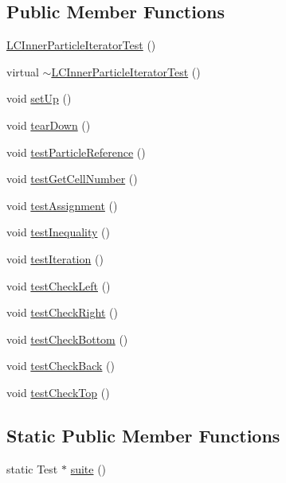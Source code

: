 \subsection*{Public Member Functions}
\begin{DoxyCompactItemize}
\item 
\hyperlink{classLCInnerParticleIteratorTest_ad3c783a3578588b75d6c973c428c84a3}{L\-C\-Inner\-Particle\-Iterator\-Test} ()
\item 
virtual \hyperlink{classLCInnerParticleIteratorTest_a4504aad35671ecb106c0987989dc8569}{$\sim$\-L\-C\-Inner\-Particle\-Iterator\-Test} ()
\item 
void \hyperlink{classLCInnerParticleIteratorTest_a1270bd9ac6d8d565b80576a21cb29787}{set\-Up} ()
\item 
void \hyperlink{classLCInnerParticleIteratorTest_a5e91e56ad97f4e9ff31a8c19192e88e0}{tear\-Down} ()
\item 
void \hyperlink{classLCInnerParticleIteratorTest_a691ec0fa8f46c909392b98bb90ded764}{test\-Particle\-Reference} ()
\item 
void \hyperlink{classLCInnerParticleIteratorTest_a36498adcccd66229a40b54acfa20ecca}{test\-Get\-Cell\-Number} ()
\item 
void \hyperlink{classLCInnerParticleIteratorTest_afd8b3239c190ef845b608d1d1ceb108c}{test\-Assignment} ()
\item 
void \hyperlink{classLCInnerParticleIteratorTest_af02554b593671d412559db8ff73ee19e}{test\-Inequality} ()
\item 
void \hyperlink{classLCInnerParticleIteratorTest_a6d1d41829ec37d5003b2cfcc48f475de}{test\-Iteration} ()
\item 
void \hyperlink{classLCInnerParticleIteratorTest_a201b0e7c640fdca8328f78ddc012abed}{test\-Check\-Left} ()
\item 
void \hyperlink{classLCInnerParticleIteratorTest_a25571212771d23d26a28028f5b643979}{test\-Check\-Right} ()
\item 
void \hyperlink{classLCInnerParticleIteratorTest_a8b2389225007973776f08a63b919653c}{test\-Check\-Bottom} ()
\item 
void \hyperlink{classLCInnerParticleIteratorTest_a23a5b0bd727f9056f764f9a548ca7916}{test\-Check\-Back} ()
\item 
void \hyperlink{classLCInnerParticleIteratorTest_ae0e5a407185c43795ca65f9f58e3a31d}{test\-Check\-Top} ()
\end{DoxyCompactItemize}
\subsection*{Static Public Member Functions}
\begin{DoxyCompactItemize}
\item 
static Test $\ast$ \hyperlink{classLCInnerParticleIteratorTest_a9426f3086943850f1b7c12d5f5276557}{suite} ()
\end{DoxyCompactItemize}
